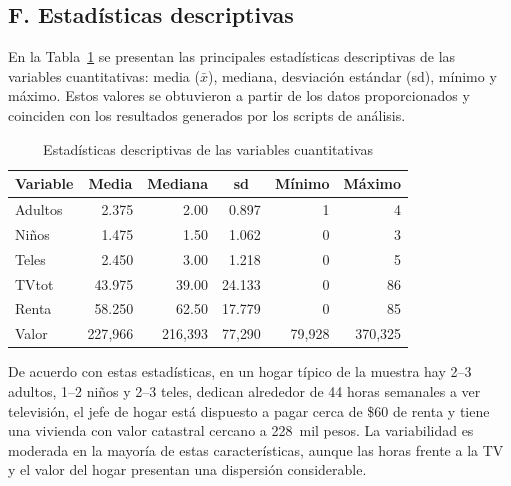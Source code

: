 \documentclass[10pt]{article}
\begin{document}
\subsection*{F. Estadísticas descriptivas}
En la Tabla~\ref{tab:stats} se presentan las principales estadísticas descriptivas de las variables cuantitativas: media ($\bar{x}$), mediana, desviación estándar (sd), mínimo y máximo. Estos valores se obtuvieron a partir de los datos proporcionados y coinciden con los resultados generados por los scripts de análisis.

\begin{table}[H]
    \centering
    \caption{Estadísticas descriptivas de las variables cuantitativas}
    \label{tab:stats}
    \begin{tabular}{lrrrrr}
        \hline
        Variable & \multicolumn{1}{c}{Media} & \multicolumn{1}{c}{Mediana} & \multicolumn{1}{c}{sd} & \multicolumn{1}{c}{Mínimo} & \multicolumn{1}{c}{Máximo} \\ \hline
        Adultos & 2.375 & 2.00 & 0.897 & 1 & 4 \\
        Niños & 1.475 & 1.50 & 1.062 & 0 & 3 \\
        Teles & 2.450 & 3.00 & 1.218 & 0 & 5 \\
        TVtot & 43.975 & 39.00 & 24.133 & 0 & 86 \\
        Renta & 58.250 & 62.50 & 17.779 & 0 & 85 \\
        Valor & 227{,}966 & 216{,}393 & 77{,}290 & 79{,}928 & 370{,}325 \\
        \hline
    \end{tabular}
\end{table}

De acuerdo con estas estadísticas, en un hogar típico de la muestra hay 2--3 adultos, 1--2 niños y 2--3 teles, dedican alrededor de 44 horas semanales a ver televisión, el jefe de hogar está dispuesto a pagar cerca de \$60 de renta y tiene una vivienda con valor catastral cercano a 228~mil pesos. La variabilidad es moderada en la mayoría de estas características, aunque las horas frente a la TV y el valor del hogar presentan una dispersión considerable.
\end{document}
